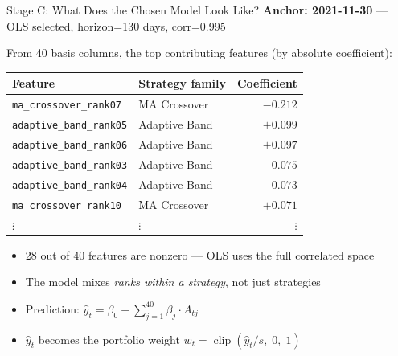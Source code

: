 \documentclass[aspectratio=169]{beamer}
\begin{document}
\begin{frame}{Stage C: What Does the Chosen Model Look Like?}
  \textbf{Anchor: 2021-11-30} — OLS selected, horizon=130 days, corr=0.995

  \vspace{0.3em}
  From 40 basis columns, the top contributing features (by absolute coefficient):

  \vspace{0.3em}
  \small
  \begin{tabular}{llr}
    \toprule
    Feature & Strategy family & Coefficient \\
    \midrule
    \texttt{ma\_crossover\_rank07}       & MA Crossover   & $-0.212$ \\
    \texttt{adaptive\_band\_rank05}      & Adaptive Band  & $+0.099$ \\
    \texttt{adaptive\_band\_rank06}      & Adaptive Band  & $+0.097$ \\
    \texttt{adaptive\_band\_rank03}      & Adaptive Band  & $-0.075$ \\
    \texttt{adaptive\_band\_rank04}      & Adaptive Band  & $-0.073$ \\
    \texttt{ma\_crossover\_rank10}       & MA Crossover   & $+0.071$ \\
    $\vdots$ & $\vdots$ & $\vdots$ \\
    \bottomrule
  \end{tabular}

  \normalsize
  \vspace{0.5em}
  \begin{itemize}
    \item 28 out of 40 features are nonzero — OLS uses the full correlated space
    \item The model mixes \emph{ranks within a strategy}, not just strategies
    \item Prediction: \(\hat{y}_t = \beta_0 + \sum_{j=1}^{40} \beta_j \cdot A_{tj}\)
    \item \(\hat{y}_t\) becomes the portfolio weight \(w_t = \operatorname{clip}(\hat{y}_t / s,\; 0,\; 1)\)
  \end{itemize}
\end{frame}
\end{document}
